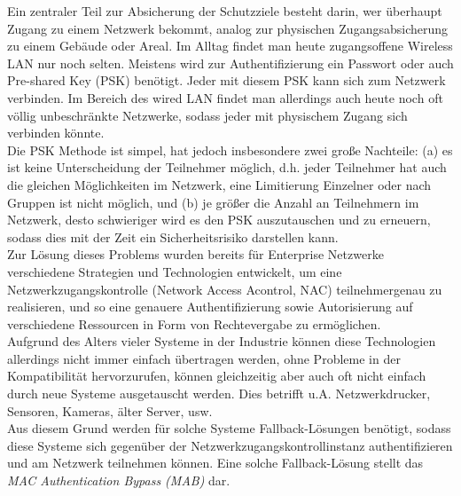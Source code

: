 \documentclass[conference]{IEEEtran}
\begin{document}
Ein zentraler Teil zur Absicherung der Schutzziele besteht darin, wer überhaupt Zugang zu einem Netzwerk bekommt, analog zur physischen Zugangsabsicherung zu einem Gebäude oder Areal. Im Alltag findet man heute zugangsoffene Wireless LAN nur noch selten. Meistens wird zur Authentifizierung ein Passwort oder auch Pre-shared Key (PSK) benötigt. Jeder mit diesem PSK kann sich zum Netzwerk verbinden. Im Bereich des wired LAN findet man allerdings auch heute noch oft völlig unbeschränkte Netzwerke, sodass jeder mit physischem Zugang sich verbinden könnte.\\

Die PSK Methode ist simpel, hat jedoch insbesondere zwei große Nachteile:
(a) es ist keine Unterscheidung der Teilnehmer möglich, d.h. jeder Teilnehmer hat auch die gleichen Möglichkeiten im Netzwerk, eine Limitierung Einzelner oder nach Gruppen ist nicht möglich, und
(b) je größer die Anzahl an Teilnehmern im Netzwerk, desto schwieriger wird es den PSK auszutauschen und zu erneuern, sodass dies mit der Zeit ein Sicherheitsrisiko darstellen kann.\\

Zur Lösung dieses Problems wurden bereits für Enterprise Netzwerke verschiedene Strategien und Technologien entwickelt, um eine Netzwerkzugangskontrolle (Network Access Acontrol, NAC) teilnehmergenau zu realisieren, und so eine genauere Authentifizierung sowie Autorisierung auf verschiedene Ressourcen in Form von Rechtevergabe zu ermöglichen.\\

Aufgrund des Alters vieler Systeme in der Industrie können diese Technologien allerdings nicht immer einfach übertragen werden, ohne Probleme in der Kompatibilität hervorzurufen, können gleichzeitig aber auch oft nicht einfach durch neue Systeme ausgetauscht werden. Dies betrifft u.A. Netzwerkdrucker, Sensoren, Kameras, älter Server, usw.\\

Aus diesem Grund werden für solche Systeme Fallback-Lösungen benötigt, sodass diese Systeme sich gegenüber der Netzwerkzugangskontrollinstanz authentifizieren und am Netzwerk teilnehmen können. Eine solche Fallback-Lösung stellt das \emph{MAC Authentication Bypass (MAB)} dar.

%
\end{document}
